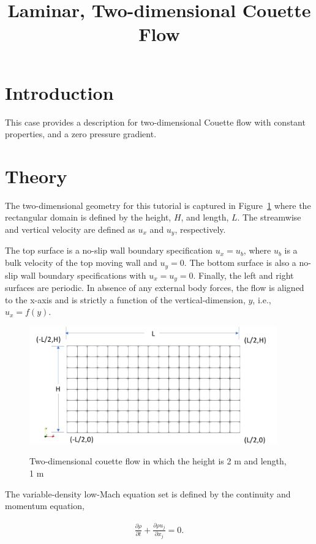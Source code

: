 \documentclass{article}
\title{Laminar, Two-dimensional Couette Flow}
\date{}
\begin{document}
\maketitle

\section{Introduction}
This case provides a description for two-dimensional Couette flow
with constant properties, and a zero pressure gradient.

\section{Theory}
The two-dimensional geometry for this tutorial is captured in 
Figure~\ref{fig:geom} where the rectangular domain is defined by the 
height, $H$, and length, $L$. The streamwise and vertical velocity are 
defined as $u_x$ and $u_y$, respectively.

The top surface is a no-slip wall boundary specification $u_x = u_b$, where $u_b$ is a bulk velocity
of the top moving wall and $u_y = 0$. The bottom surface is also a no-slip wall boundary 
specifications with $u_x = u_y = 0$.
Finally, the left and right surfaces are periodic. In absence of any 
external body forces, the flow is aligned to the x-axis and is 
strictly a function of the vertical-dimension, $y$, i.e., $u_x = f(y)$.

\begin{figure}[!htbp]
  \centering
  {
   \includegraphics[height=2.0in]{images/2d_quad9_couette_geom.pdf}
  }
  \caption{Two-dimensional couette flow in which the height is 2 m and length, 1 m}
  \label{fig:geom}
\end{figure}

The variable-density low-Mach equation set is defined by the continuity and momentum equation,

\begin{align}
  \frac {\partial \rho }{\partial t} + \frac{ \partial \rho u_j}{\partial x_j} = 0.
\label{eq:contEq}
\end{align} 
\end{document}
